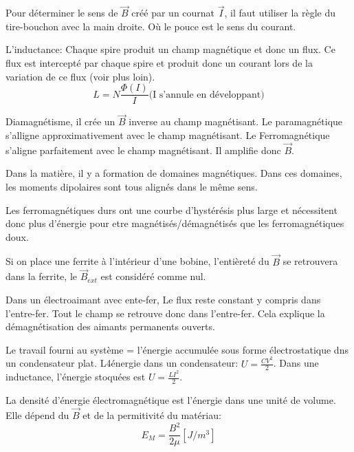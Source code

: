 \documentclass[11pt,a4paper]{article} %
\newcommand{\B}{\vec B}
\begin{document}
Pour déterminer le sens de $\B$ créé par un cournat $\vec I$, il faut utiliser la règle du tire-bouchon avec la main droite. Où le pouce est le sens du courant.

L'inductance: Chaque spire produit un champ magnétique et donc un flux. Ce flux est intercepté par chaque spire et produit donc un courant lors de la variation de ce flux (voir plus loin).
$$L = N\frac{\Phi(I)}{I} \textrm{(I s'annule en développant)}$$ 

Diamagnétisme, il crée un $\B$ inverse au champ magnétisant. Le paramagnétique s'alligne approximativement avec le champ magnétisant. Le Ferromagnétique s'aligne parfaitement avec le champ magnétisant. Il amplifie donc $\B$.

Dans la matière, il y a formation de domaines magnétiques. Dans ces domaines, les moments dipolaires sont tous alignés dans le même sens.

Les ferromagnétiques durs ont une courbe d'hystérésis plus large et nécessitent donc plus d'énergie pour etre magnétisés/démagnétisés que les ferromagnétiques doux.

Si on place une ferrite à l'intérieur d'une bobine, l'entièreté du $\B$ se retrouvera dans la ferrite, le $\B_{ext}$ est considéré comme nul.

Dans un électroaimant avec ente-fer, Le flux reste constant y compris dans l'entre-fer. Tout le champ se retrouve donc dans l'entre-fer. Cela explique la démagnétisation des aimants permanents ouverts.

Le travail fourni au système = l'énergie accumulée sous forme électrostatique dns un condensateur plat. L4énergie dans un condensateur: $U = \frac{CV^2}{2}$. Dans une inductance, l'énergie stoquées est $U = \frac{LI^2}{2}$.

La densité d'énergie électromagnétique est l'énergie dans une unité de volume. Elle dépend du $\B$ et de la permitivité du matériau:
$$E_M =  \frac{B^2}{2\mu} [J/m^3]$$
\end{document}
